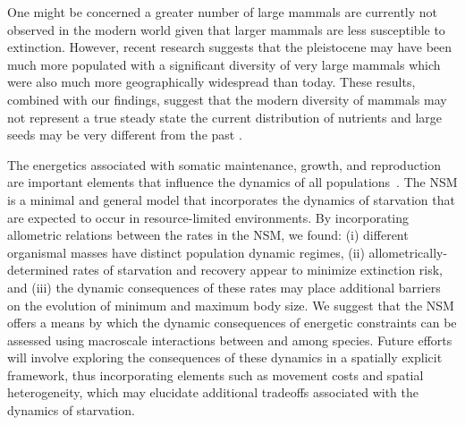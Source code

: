\documentclass{pnastwo}
\begin{document}
\begin{article}
One might be concerned a greater number of large mammals are currently not
observed in the modern world given that larger mammals are less susceptible
to extinction.  However, recent research suggests that the pleistocene may
have been much more populated with a significant diversity of very large
mammals \cite{Doughty:2013kd,Doughty:2015hy,Doughty:2015je} which were also
much more geographically widespread than today. These results, combined with
our findings, suggest that the modern diversity of mammals may not represent a
true steady state the current distribution of nutrients and large seeds may
be very different from the past
\cite{Doughty:2013kd,Doughty:2015hy,Doughty:2015je}.

The energetics associated with somatic maintenance, growth, and reproduction
are important elements that influence the dynamics of all
populations~\cite{Stearns:1989ip}.  The NSM is a minimal and general model
that incorporates the dynamics of starvation that are expected to occur in
resource-limited environments.  By incorporating allometric relations between
the rates in the NSM, we found: (i) different organismal masses have distinct
population dynamic regimes, (ii) allometrically-determined rates of
starvation and recovery appear to minimize extinction risk, and (iii) the
dynamic consequences of these rates may place additional barriers on the
evolution of minimum and maximum body size.  We suggest that the NSM offers a
means by which the dynamic consequences of energetic constraints can be
assessed using macroscale interactions between and among species.  Future
efforts will involve exploring the consequences of these dynamics in a
spatially explicit framework, thus incorporating elements such as movement
costs and spatial heterogeneity, which may elucidate additional tradeoffs
associated with the dynamics of starvation.

%
%
%
%
%
%
%
%
%
%
%
%
%


\end{article}
\end{document}
